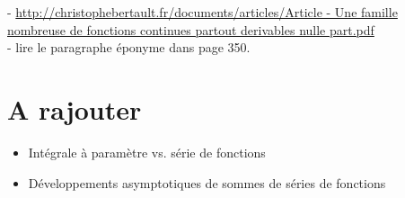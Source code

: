 - \url{http://christophebertault.fr/documents/articles/Article - Une famille nombreuse de fonctions continues partout derivables nulle part.pdf} \\
- lire le paragraphe éponyme dans \cite{contre-exemples} page 350. \\

\section{A rajouter}

\begin{itemize}
    \item Intégrale à paramètre vs. série de fonctions
    \item Développements asymptotiques de sommes de séries de fonctions
\end{itemize}